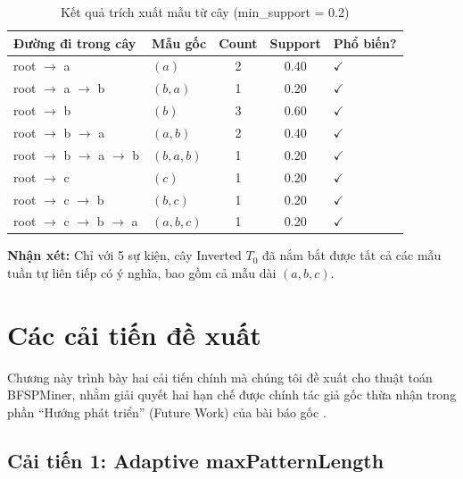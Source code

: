 \documentclass[a4paper,12pt]{report}
\begin{document}
\begin{table}[H]
    \centering
    \caption{Kết quả trích xuất mẫu từ cây (min\_support = 0.2)}
    \label{tab:trace_patterns}
    \begin{tabular}{llccl}
        \toprule
        \textbf{Đường đi trong cây} & \textbf{Mẫu gốc} & \textbf{Count} & \textbf{Support} & \textbf{Phổ biến?} \\
        \midrule
        root $\rightarrow$ a              & $(a)$         & 2 & 0.40 & $\checkmark$ \\
        root $\rightarrow$ a $\rightarrow$ b     & $(b, a)$      & 1 & 0.20 & $\checkmark$ \\
        root $\rightarrow$ b              & $(b)$         & 3 & 0.60 & $\checkmark$ \\
        root $\rightarrow$ b $\rightarrow$ a     & $(a, b)$      & 2 & 0.40 & $\checkmark$ \\
        root $\rightarrow$ b $\rightarrow$ a $\rightarrow$ b & $(b, a, b)$ & 1 & 0.20 & $\checkmark$ \\
        root $\rightarrow$ c              & $(c)$         & 1 & 0.20 & $\checkmark$ \\
        root $\rightarrow$ c $\rightarrow$ b     & $(b, c)$      & 1 & 0.20 & $\checkmark$ \\
        root $\rightarrow$ c $\rightarrow$ b $\rightarrow$ a & $(a, b, c)$ & 1 & 0.20 & $\checkmark$ \\
        \bottomrule
    \end{tabular}
\end{table}

\textbf{Nhận xét:} Chỉ với 5 sự kiện, cây Inverted $T_0$ đã nắm bắt được tất cả các mẫu tuần tự liên tiếp có ý nghĩa, bao gồm cả mẫu dài $(a, b, c)$.

\chapter{Các cải tiến đề xuất}
\label{chap:improvements}

Chương này trình bày hai cải tiến chính mà chúng tôi đề xuất cho thuật toán BFSPMiner, nhằm giải quyết hai hạn chế được chính tác giả gốc thừa nhận trong phần ``Hướng phát triển'' (Future Work) của bài báo gốc \cite{hassani2019}.

\section{Cải tiến 1: Adaptive maxPatternLength}
\label{sec:adaptive}
\end{document}
